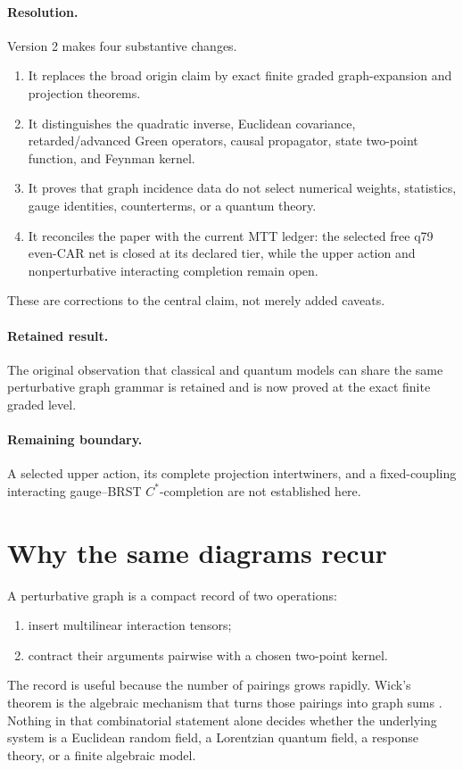 \documentclass[11pt,a4paper]{article}
\begin{document}
\paragraph{Resolution.} Version 2 makes four substantive changes.
\begin{enumerate}
\item It replaces the broad origin claim by exact finite graded
graph-expansion and projection theorems.
\item It distinguishes the quadratic inverse, Euclidean covariance,
retarded/advanced Green operators, causal propagator, state two-point
function, and Feynman kernel.
\item It proves that graph incidence data do not select numerical weights,
statistics, gauge identities, counterterms, or a quantum theory.
\item It reconciles the paper with the current MTT ledger: the selected
free q79 even-CAR net is closed at its declared tier, while the upper action
and nonperturbative interacting completion remain open.
\end{enumerate}
These are corrections to the central claim, not merely added caveats.

\paragraph{Retained result.} The original observation that classical and
quantum models can share the same perturbative graph grammar is retained
and is now proved at the exact finite graded level.

\paragraph{Remaining boundary.} A selected upper action, its complete
projection intertwiners, and a fixed-coupling interacting gauge--BRST
\(C^*\)-completion are not established here.

\section{Why the same diagrams recur}

A perturbative graph is a compact record of two operations:
\begin{enumerate}
\item insert multilinear interaction tensors;
\item contract their arguments pairwise with a chosen two-point kernel.
\end{enumerate}
The record is useful because the number of pairings grows rapidly.
Wick's theorem is the algebraic mechanism that turns those pairings into
graph sums \cite{Wick1950}.  Nothing in that combinatorial statement alone
decides whether the underlying system is a Euclidean random field, a
Lorentzian quantum field, a response theory, or a finite algebraic model.
\end{document}
